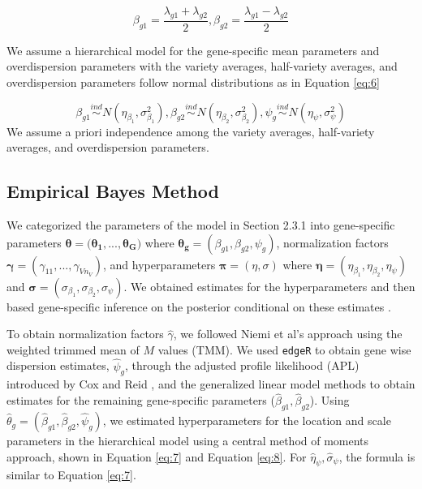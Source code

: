 \begin{equation}
\label{eq:5}
\beta_{g1} = \frac{\lambda_{g1}+\lambda_{g2}}{2}, \beta_{g2} = \frac{\lambda_{g1}-\lambda_{g2}}{2}
\end{equation}

We assume a hierarchical model for the gene-specific mean parameters and overdispersion parameters with the variety averages, half-variety averages, and overdispersion parameters follow normal distributions as in Equation \eqref{eq:6}

\begin{equation}
\label{eq:6}
\beta_{g1} \stackrel{ind}{\sim} N(\eta_{\beta_1}, \sigma^2_{\beta_1}), \beta_{g2} \stackrel{ind}{\sim} N(\eta_{\beta_2} , \sigma^2_{\beta_2}), \psi_g \stackrel{ind}{\sim} N(\eta_\psi, \sigma^2_\psi)
\end{equation}
We assume a priori independence among the variety averages, half-variety averages, and overdispersion parameters.


\subsection{Empirical Bayes Method}

We categorized the parameters of the model in Section 2.3.1 into gene-specific parameters $\mathbf{\theta} = (\mathbf{\theta_1}, ..., \mathbf{\theta_G)}$ where $\mathbf{\theta_g} = (\beta_{g1}, \beta_{g2}, \psi_g)$, normalization factors $\mathbf{\gamma} = (\gamma_{11}, ..., \gamma_{V n_V})$, and hyperparameters $\mathbf{\pi} = (\eta, \sigma)$ where $\mathbf{\eta} = (\eta_{\beta_1}, \eta_{\beta_2}, \eta_\psi)$ and $\mathbf{\sigma} = (\sigma_{\beta_1}, \sigma_{\beta_2}, \sigma_\psi)$. We obtained estimates for the hyperparameters and then based gene-specific inference on the posterior conditional on these estimates \citep{niemi2015empirical}.


To obtain normalization factors $\hat{\gamma}$, we followed Niemi et al's approach \citep{niemi2015empirical} using the weighted trimmed mean of $M$ values (TMM)\citep{robinson2010scaling}. We used {\tt edgeR} to obtain gene wise dispersion estimates, $\hat{\psi}_g$, through the adjusted profile likelihood (APL) introduced by Cox and Reid \citep{cox1987parameter}, and the generalized linear model methods to obtain estimates for the remaining gene-specific parameters ($\hat{\beta}_{g1}, \hat{\beta}_{g2}$)\citep{robinson2010scaling}. Using $\hat{\theta}_g = (\hat{\beta}_{g1} , \hat{\beta}_{g2}, \hat{\psi}_g)$, we estimated hyperparameters for the location and scale parameters in the hierarchical model using a central method of moments approach, shown in Equation \eqref{eq:7} and Equation \eqref{eq:8}. For $\hat{\eta}_{\psi}, \hat{\sigma}_{\psi}$, the formula is similar to Equation \eqref{eq:7}.


